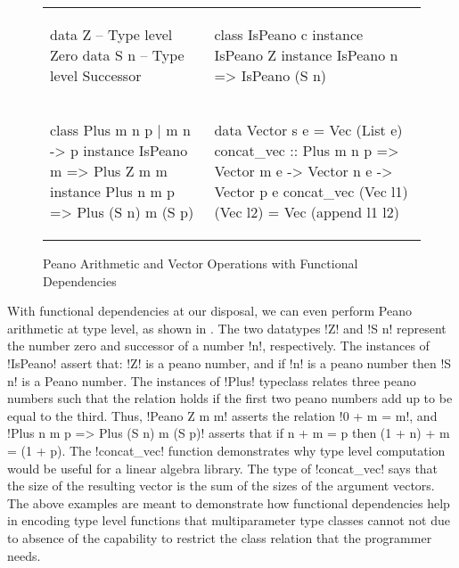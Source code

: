 \documentclass[format=acmsmall,manuscript,review,screen,nonacm,margin=1in,11pt]{acmart}
\begin{document}
\begin{figure}[ht]
  \footnotesize
  \begin{tabular}{l l}
\begin{code}
data Z   -- Type level Zero
data S n -- Type level Successor
\end{code}&%
\begin{code}
class IsPeano c
instance IsPeano Z
instance IsPeano n => IsPeano (S n)
\end{code}\\
\begin{code}
class Plus m n p | m n -> p
instance IsPeano m => Plus Z m m
instance Plus n m p => Plus (S n) m (S p)
\end{code}&%
\begin{code}
data Vector s e = Vec (List e)
concat_vec :: Plus m n p
     => Vector m e -> Vector n e -> Vector p e
concat_vec (Vec l1) (Vec l2) = Vec (append l1 l2)
\end{code}
  \end{tabular}
  \caption{Peano Arithmetic and Vector Operations with Functional Dependencies}
  \label{fig:peano-arith}
\end{figure}

With functional dependencies at our disposal, we can even perform Peano arithmetic at type level,
as shown in . The two datatypes !Z! and !S n!
represent the number zero and successor of a number !n!, respectively.
The instances of !IsPeano! assert that: !Z! is a peano number, and if !n! is a peano number
then !S n! is a Peano number. The instances of !Plus! typeclass relates three peano numbers such that the relation
holds if the first two peano numbers add up to be equal to the third. Thus, !Peano Z m m! asserts the relation
!0 + m = m!, and !Plus n m p => Plus (S n) m (S p)! asserts that if n + m = p then (1 + n) + m = (1 + p).
The !concat_vec! function demonstrates why type level computation would be useful
for a linear algebra library. The type of !concat_vec! says that the size of the resulting
vector is the sum of the sizes of the argument vectors.
The above examples are meant to demonstrate how functional dependencies help in encoding
type level functions that multiparameter type classes cannot not due to absence of the capability
to restrict the class relation that the programmer needs.
\end{document}
